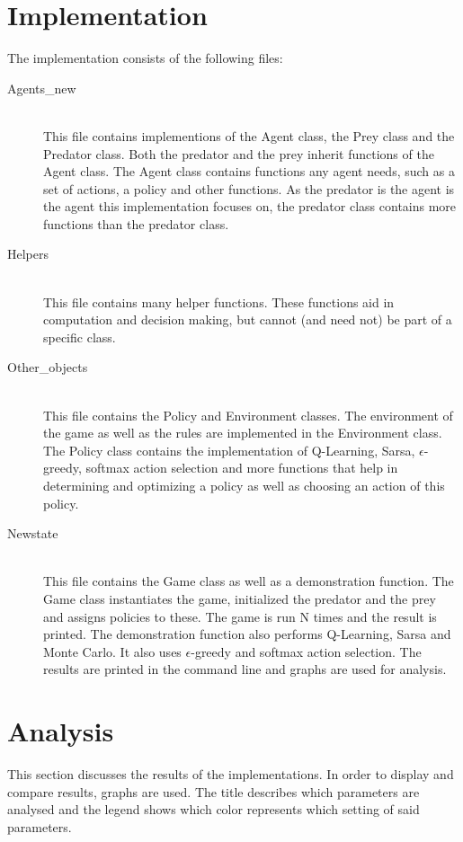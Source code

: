 \documentclass{article}
\begin{document}
\section{Implementation}
The implementation consists of the following files:
\begin{description}
	\item[Agents\_new] \hfill \\ 
	This file contains implementions of the Agent class, the Prey class and the Predator class. Both the predator and the prey inherit functions of the Agent class. The Agent class contains functions any agent needs, such as a set of actions, a policy and other functions. As the predator is the agent is the agent this implementation focuses on, the predator class contains more functions than the predator class.
	
	\item[Helpers] \hfill \\ 
	This file contains many helper functions. These functions aid in computation and decision making, but cannot (and need not) be part of a specific class.
	
	\item[Other\_objects] \hfill \\ %
	This file contains the Policy and Environment classes. The environment of the game as well as the rules are implemented in the Environment class. The Policy class contains the implementation of Q-Learning, Sarsa, $\epsilon$-greedy, softmax action selection and more functions that help in determining and optimizing a policy as well as choosing an action of this policy.
	\item[Newstate] \hfill \\ 
	This file contains the Game class as well as a demonstration function. The Game class instantiates the game, initialized the predator and the prey and assigns policies to these. The game is run N times and the result is printed. The demonstration function also performs Q-Learning, Sarsa and Monte Carlo. It also uses $\epsilon$-greedy and softmax action selection. The results are printed in the command line and graphs are used for analysis.
\end{description}
\pagebreak
\section{Analysis}
This section discusses the results of the implementations. In order to display and compare results, graphs are used. The title describes which parameters are analysed and the legend shows which color represents which setting of said parameters.
\end{document}
